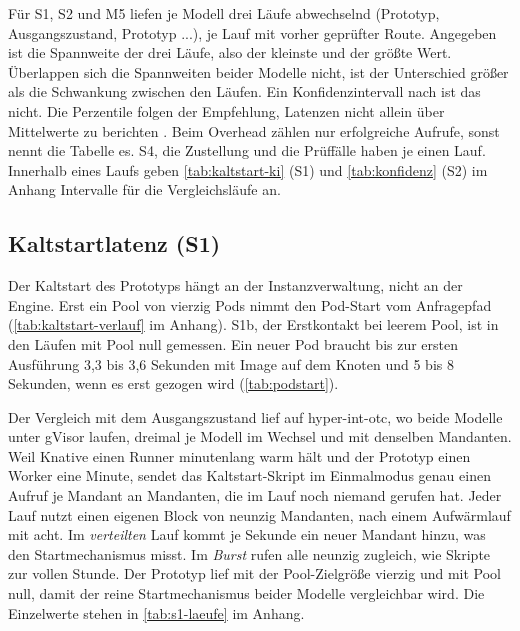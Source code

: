 Für S1, S2 und M5 liefen je Modell drei Läufe abwechselnd (Prototyp, Ausgangszustand, Prototyp ...), je
Lauf mit vorher geprüfter Route.
 Angegeben ist die Spannweite der drei Läufe, also der kleinste und der größte Wert. Überlappen
sich die Spannweiten beider Modelle nicht, ist der Unterschied größer als die Schwankung zwischen den Läufen. Ein
Konfidenzintervall nach \textcite[S.~4]{hoefler_scientific_2015} ist das nicht. Die Perzentile
folgen der Empfehlung, Latenzen nicht allein über Mittelwerte zu
berichten \autocites[S.~6]{hoefler_scientific_2015}[Abschn.~6.5]{scheuner_function-as-a-service_2020}.
Beim Overhead zählen nur erfolgreiche Aufrufe, sonst nennt die Tabelle es. S4, die Zustellung und die Prüffälle haben je einen Lauf. Innerhalb eines Laufs geben
\autoref{tab:kaltstart-ki} (S1) und \autoref{tab:konfidenz} (S2) im Anhang Intervalle für die Vergleichsläufe an.

\subsection{Kaltstartlatenz (S1)}
\label{sec:kaltstart}

Der Kaltstart des Prototyps hängt an der Instanzverwaltung, nicht an der Engine. Erst ein Pool von vierzig Pods nimmt
den Pod-Start vom Anfragepfad (\autoref{tab:kaltstart-verlauf} im Anhang). S1b, der Erstkontakt bei leerem Pool, ist in den
Läufen mit Pool null gemessen. Ein neuer Pod braucht bis zur ersten Ausführung 3,3 bis 3,6 Sekunden mit Image auf dem Knoten und 5 bis 8 Sekunden, wenn es erst gezogen wird
(\autoref{tab:podstart}).

Der Vergleich mit dem Ausgangszustand lief auf hyper-int-otc, wo beide Modelle unter gVisor
laufen, dreimal je Modell im Wechsel und mit denselben Mandanten. Weil Knative einen Runner minutenlang warm hält und der Prototyp
einen Worker eine Minute, sendet das Kaltstart-Skript im Einmalmodus genau einen Aufruf je Mandant an Mandanten, die im
Lauf noch niemand gerufen hat. Jeder Lauf nutzt einen eigenen Block von neunzig Mandanten, nach einem Aufwärmlauf mit
acht. Im \emph{verteilten} Lauf kommt je Sekunde ein neuer Mandant hinzu, was den Startmechanismus misst.
Im \emph{Burst} rufen alle neunzig zugleich, wie Skripte zur vollen Stunde. Der Prototyp lief mit der
Pool-Zielgröße vierzig und mit Pool null, damit der reine Startmechanismus beider Modelle vergleichbar wird. Die
Einzelwerte stehen in \autoref{tab:s1-laeufe} im Anhang.

